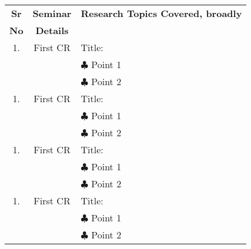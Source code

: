 \begin{longtable}{| c | c | L{11cm} |}
	\hline
	\textbf{Sr} &
	\textbf{Seminar} &
	\textbf{Research Topics Covered, broadly} \\
	\textbf{No} &
	\textbf{Details} &
	\textbf{} \\ \hline
	1. &									   %
	First CR &								   %
	Title:\\
	{} &									   %
	{} &									   %
	$\clubsuit$ Point 1 \\
	{} &									   %
	{} &									   %
	$\clubsuit$ Point 2 \\ \hline

	1. &									   %
	First CR &								   %
	Title:\\
	{} &									   %
	{} &									   %
	$\clubsuit$ Point 1 \\
	{} &									   %
	{} &									   %
	$\clubsuit$ Point 2 \\ \hline
	
	1. &									   %
	First CR &								   %
	Title:\\
	{} &									   %
	{} &									   %
	$\clubsuit$ Point 1 \\
	{} &									   %
	{} &									   %
	$\clubsuit$ Point 2 \\ \hline
	
	1. &									   %
	First CR &								   %
	Title:\\
	{} &									   %
	{} &									   %
	$\clubsuit$ Point 1 \\
	{} &									   %
	{} &									   %
	$\clubsuit$ Point 2 \\ \hline
	

\end{longtable}
